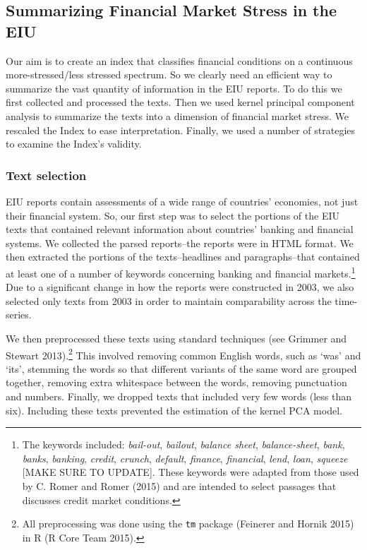 \documentclass[]{article}
\let\rmarkdownfootnote\footnote%
\def\footnote{\protect\rmarkdownfootnote}
\begin{document}
\subsection{Summarizing Financial Market Stress in the
EIU}\label{summarizing-financial-market-stress-in-the-eiu}

Our aim is to create an index that classifies financial conditions on a
continuous more-stressed/less stressed spectrum. So we clearly need an
efficient way to summarize the vast quantity of information in the EIU
reports. To do this we first collected and processed the texts. Then we
used kernel principal component analysis to summarize the texts into a
dimension of financial market stress. We rescaled the Index to ease
interpretation. Finally, we used a number of strategies to examine the
Index's validity.

\subsubsection{Text selection}\label{text-selection}

EIU reports contain assessments of a wide range of countries' economies,
not just their financial system. So, our first step was to select the
portions of the EIU texts that contained relevant information about
countries' banking and financial systems. We collected the parsed
reports--the reports were in HTML format. We then extracted the portions
of the texts--headlines and paragraphs--that contained at least one of a
number of keywords concerning banking and financial markets.\footnote{The
  keywords included: \emph{bail-out}, \emph{bailout}, \emph{balance
  sheet}, \emph{balance-sheet}, \emph{bank}, \emph{banks},
  \emph{banking}, \emph{credit}, \emph{crunch}, \emph{default},
  \emph{finance}, \emph{financial}, \emph{lend}, \emph{loan},
  \emph{squeeze} {[}MAKE SURE TO UPDATE{]}. These keywords were adapted
  from those used by C. Romer and Romer (2015) and are intended to
  select passages that discusses credit market conditions.} Due to a
significant change in how the reports were constructed in 2003, we also
selected only texts from 2003 in order to maintain comparability across
the time-series.

We then preprocessed these texts using standard techniques (see Grimmer
and Stewart 2013).\footnote{All preprocessing was done using the
  \texttt{tm} package (Feinerer and Hornik 2015) in R (R Core Team
  2015).} This involved removing common English words, such as `was' and
`its', stemming the words so that different variants of the same word
are grouped together, removing extra whitespace between the words,
removing punctuation and numbers. Finally, we dropped texts that
included very few words (less than six). Including these texts prevented
the estimation of the kernel PCA model.
\end{document}
